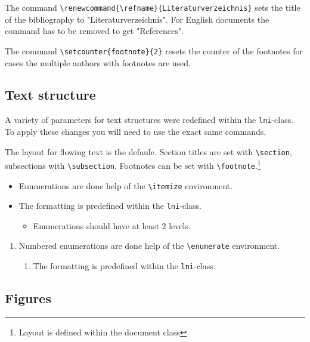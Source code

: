 \documentclass[english]{lni}
\begin{document}
The command \verb|\renewcommand{\refname}{Literaturverzeichnis}| sets the title of the bibliography to "Literaturverzeichnis". For English documents the command has to be removed to get "References".

The command \verb|\setcounter{footnote}{2}| resets the counter of the footnotes for cases the multiple authors with footnotes are used.

\subsection{Text structure}

A variety of parameters for text structures were redefined within the \texttt{lni}-class. To apply these changes you will need to use the exact same commands.

The layout for flowing text is the defaule.
Section titles are set with \verb|\section|, subsections with \verb|\subsection|. Footnotes can be set with \verb|\footnote|.\footnote{Layout is defined within the document class}
\begin{itemize}
	\item Enumerations are done help of the \verb|\itemize| environment.
	\item The formatting is predefined within the \texttt{lni}-class.
	      \begin{itemize}
		      \item Enumerations should have at least 2 levels.
	      \end{itemize}
\end{itemize}
\begin{enumerate}
	\item Numbered enumerations are done help of the \verb|\enumerate| environment.
	      \begin{enumerate}
		      \item The formatting is predefined within the \texttt{lni}-class.
	      \end{enumerate}
\end{enumerate}

\subsection{Figures}
\end{document}
